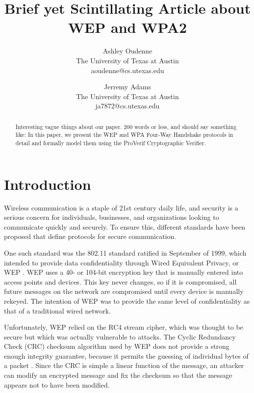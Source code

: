\documentclass[11pt, twocolumn]{article} %
\title{\textbf{Brief yet Scintillating Article about WEP and WPA2}}
\author{
	Ashley Oudenne\\
	The University of Texas at Austin\\
	aoudenne@cs.utexas.edu\\
	\and
	Jerremy Adams\\
	The University of Texas at Austin\\
	ja7872@cs.utexas.edu
}
\begin{document}
\maketitle
\begin{abstract}
Interesting vague things about our paper.
200 words or less, and should say something like:
In this paper, we present the WEP and WPA Four-Way Handshake protocols in detail and formally model them using the ProVerif Cryptographic Verifier. 
\end{abstract}

\section{Introduction}
Wireless communication is a staple of 21st century daily life, and security is a serious concern for individuals, businesses, and organizations looking to communicate quickly and securely.  To ensure this, different standards have been proposed that define protocols for secure communication.  

One such standard was the 802.11 standard ratified in September of 1999, which intended to provide data confidentiality through Wired Equivalent Privacy, or WEP \cite{IEEE802.11}.  WEP uses a 40- or 104-bit encryption key that is manually entered into access points and devices.  This key never changes, so if it is compromised, all future messages on the network are compromised until every device is manually rekeyed.  The intention of WEP was to provide the same level of confidentiality as that of a traditional wired network.  

Unfortunately, WEP relied on the RC4 stream cipher, which was thought to be secure but which was actually vulnerable to attacks.  The Cyclic Redundancy Check (CRC) checksum algorithm used by WEP does not provide a strong enough integrity guarantee, because it permits the guessing of individual bytes of a packet \cite{bulbul08}.  Since the CRC is simple a linear function of the message, an attacker can modify an encrypted message and fix the checksum so that the message appears not to have been modified.
\end{document}
